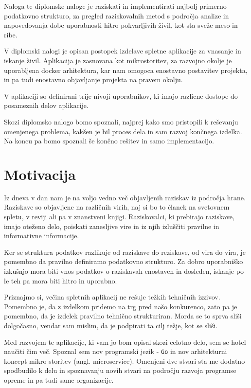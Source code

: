 \documentclass[a4paper, 12pt]{book}
\begin{document}
Naloga te diplomske naloge je raziskati in implementirati najbolj primerno podatkovno strukturo, za pregled raziskovalnih metod s področja analize in napovedovanja dobe uporabnosti hitro pokvarljivih živil, kot sta sveže meso in ribe. 

V diplomski nalogi je opisan postopek izdelave spletne aplikacije za vnasanje in iskanje živil. Aplikacija je zasnovana kot mikrostoritev, za razvojno okolje je uporabljena docker arhitektura, kar nam omogoca enostavno postavitev projekta, in pa tudi enostavno objavljanje projekta na pravem okolju. 

V aplikaciji so definirani trije nivoji uporabnikov, ki imajo razlicne dostope do posameznih delov aplikacije.

Skozi diplomsko nalogo bomo spoznali, najprej kako smo pristopili k reševanju omenjenega problema, kakšen je bil proces dela in sam razvoj končnega izdelka. Na koncu pa bomo spoznali še končno rešitev in samo implementacijo.

\pagebreak

\section{Motivacija}

Iz dneva v dan nam je na voljo vedno več objavljenih raziskav iz področja hrane. Raziskave so objavljene na različnih virih, naj si bo to članek na svetovnem spletu, v reviji ali pa v znanstveni knjigi. Raziskovalci, ki prebirajo raziskave, imajo oteženo delo, poiskati zanesljive vire in iz njih izluščiti pravilne in informativne informacije.

Ker se struktura podatkov razlikuje od raziskave do reziskave, od vira do vira, je pomembno da pravilno definiramo podatkovno strukturo. Za dobro uporabniško izkušnjo mora biti vnos podatkov o raziskavah enostaven in dosleden, iskanje po le teh pa mora biti hitro in uporabno.

Priznajmo si, večina spletnih aplikacij ne rešuje težkih tehničnih izzivov. Pomembno je, da z izdelkom pridemo na trg pred našo konkurenco, zato pa je pomembno, da je izdelek pravilno tehnično strukturiran.
Morda se to sprva sliši dolgočasno, vendar sam mislim, da je podpirati ta cilj težje, kot se sliši.

Med razvojem te aplikacije, ki vam jo bom opisal skozi celotno delo, sem se hotel naučiti čim več. Spoznal sem nov programski jezik - \verb=Go= in nov arhitekturni koncept mikro storitev (angl. microservice). Omenjeni dve stvari sta me dodatno spodbudilo k delu in spoznavanju novih stvari na področju razvoja programse opreme in pa tudi same organizacije.
\end{document}
